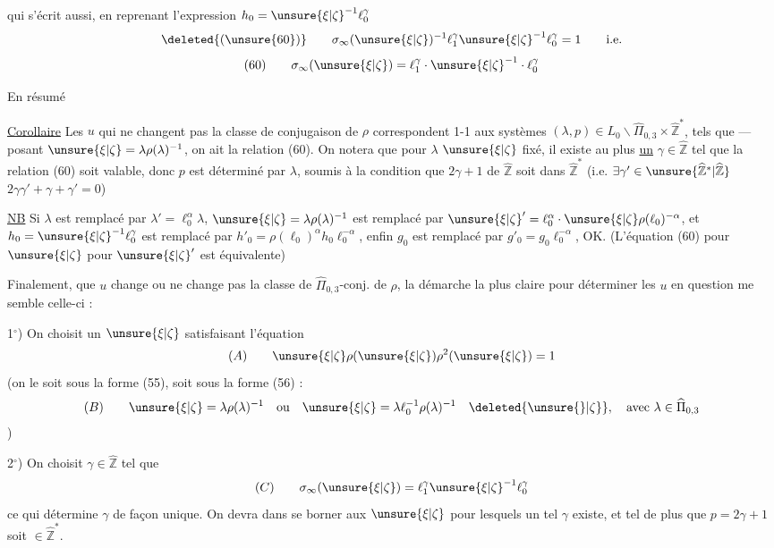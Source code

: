 qui s'écrit aussi, en reprenant l'expression $h_0=\unsure{\xi|\zeta}^{-1}\ell_0^\gamma$
\[
\deleted{(\unsure{60})}\qquad
\sigma_\infty(\unsure{\xi|\zeta})^{-1}\ell_1^\gamma\unsure{\xi|\zeta}^{-1}\ell_0^\gamma=1
\qquad\text{i.e.}
\]
\[
(60)\qquad \sigma_\infty(\unsure{\xi|\zeta})=\ell_1^\gamma\cdot\unsure{\xi|\zeta}^{-1}\cdot\ell_0^\gamma
\]

En résumé

\uline{Corollaire} Les $u$ qui ne changent pas la classe de conjugaison de $\rho$  correspondent 1-1 aux systèmes $(\lambda,p)\in L_0\backslash\widehat{\Pi}_{0,3}\times\widehat{\mathbb Z}^{*}$, tels que --- posant $\unsure{\xi|\zeta}=\lambda\rho(\lambda)^{-1}$,  on ait la relation (60).
On notera que pour $\lambda$  $\unsure{\xi|\zeta}$ fixé, il existe au plus \uline{un} $\gamma\in\widehat{\mathbb Z}$ tel que la relation (60) soit valable, donc $p$ est déterminé par $\lambda$, soumis à la condition  que  $2\gamma+1$ de $\widehat{\mathbb Z}$ soit dans $\widehat{\mathbb Z}^{*}$ (i.e. $\exists\gamma'\in\unsure{\widehat{\mathbb Z}^{*}|\widehat{\mathbb Z}}$  $2\gamma\gamma'+\gamma+\gamma'=0$)


\uline{NB} Si $\lambda$ est remplacé par $\lambda'=\ell_0^\alpha\lambda$, $\unsure{\xi|\zeta}=\lambda\rho(\lambda)^{-1}$ est remplacé par $\unsure{\xi|\zeta}'=\ell_0^\alpha\cdot\unsure{\xi|\zeta}\rho(\ell_0)^{-\alpha}$, et $h_0=\unsure{\xi|\zeta}^{-1}\ell_0^\gamma$ est remplacé par $h'_0=\rho(\ell_0)^\alpha h_0\ell_0^{-\alpha}$, enfin $g_0$ est remplacé par $g'_0=g_0\ell_0^{-\alpha}$, OK. \unsure{!} (L'équation (60) pour $\unsure{\xi|\zeta}$  pour $\unsure{\xi|\zeta}'$ est équivalente)

Finalement, que $u$ change ou ne change pas la classe de $\widehat{\Pi}_{0,3}$-conj. de $\rho$, la démarche la plus claire pour déterminer les $u$ en question me semble celle-ci :

1$^\circ$) On choisit un $\unsure{\xi|\zeta}$  satisfaisant l'équation
\[
(A)\qquad \unsure{\xi|\zeta}\rho(\unsure{\xi|\zeta})\rho^2(\unsure{\xi|\zeta})=1
\]
(on le  soit sous la forme (55), soit sous la forme (56)\deleted{\unsure{)}} :
\[
(B)\qquad
\unsure{\xi|\zeta}=\lambda\rho(\lambda)^{-1}
\quad\text{ou}\quad
\unsure{\xi|\zeta}=\lambda\ell_0^{-1}\rho(\lambda)^{-1}
\quad\deleted{\unsure{\rbrace|\zeta}},\quad\text{avec }\lambda\in\widehat{\Pi}_{0,3}
\]
)

2$^\circ$) On choisit $\gamma\in\widehat{\mathbb Z}$ tel que
\[
(C)\qquad \sigma_\infty(\unsure{\xi|\zeta})=\ell_1^\gamma\unsure{\xi|\zeta}^{-1}\ell_0^\gamma
\]
ce qui détermine $\gamma$ de façon unique. On devra dans  se borner aux $\unsure{\xi|\zeta}$  pour lesquels un tel $\gamma$ existe, et tel de plus que $p=2\gamma+1$ soit $\in\widehat{\mathbb Z}^{*}$.
